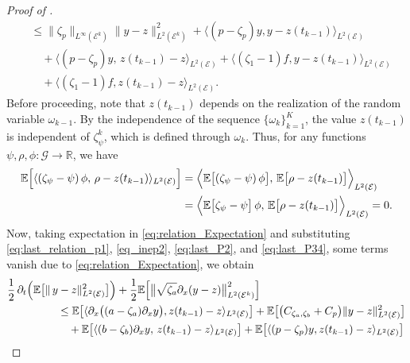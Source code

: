 \documentclass[a4paper, 10pt, english]{article}
\def\to{\rightarrow}
\begin{document}
\begin{proof}[Proof of  ]
\begin{align}
&\le
\|\zeta_p\|_{L^\infty(\mathcal{E}^k)}\|y - z\|_{L^2(\mathcal{E}^k)}^2
+
\bigl\langle
  (p - \zeta_p)y,
  y - z(t_{k-1})
\bigr\rangle_{L^2(\mathcal{E})}
\nonumber \\
&\quad
+
\bigl\langle
  (p - \zeta_p)y,
  \,z(t_{k-1}) - z
\bigr\rangle_{L^2(\mathcal{E})}
+
\bigl\langle
  (\zeta_1 - 1)f,
  y - z(t_{k-1})
\bigr\rangle_{L^2(\mathcal{E})}
\nonumber \\
&\quad
+
\bigl\langle
  (\zeta_1 - 1)f,
  z(t_{k-1}) - z
\bigr\rangle_{L^2(\mathcal{E})}.
\end{align}
Before proceeding, note that $z(t_{k-1})$ depends on the realization of the random variable $\omega_{k-1}$. By the independence of the sequence $\{\omega_k\}_{k=1}^K$, the value $z(t_{k-1})$ is independent of $\zeta_\psi^k$, which is defined through $\omega_k$. Thus, for any functions $\psi, \rho, \phi: \mathcal{G} \to \mathbb{R}$, we have
\begin{align}\label{eq:relation_Expectation}
\nonumber
\mathbb{E}\Bigl[\langle (\zeta_\psi - \psi)\,\phi,\,\rho - z(t_{k-1})\rangle_{L^2(\mathcal{E})}\Bigr]
&=
\Bigl\langle
  \mathbb{E}\bigl[(\zeta_\psi - \psi)\,\phi\bigr],
  \,\mathbb{E}\bigl[\rho - z(t_{k-1})\bigr]
\Bigr\rangle_{L^2(\mathcal{E})}
\\
&=
\Bigl\langle
  \mathbb{E}\bigl[\zeta_\psi - \psi\bigr]\,\phi,
  \,\mathbb{E}\bigl[\rho - z(t_{k-1})\bigr]
\Bigr\rangle_{L^2(\mathcal{E})}
= 0.
\end{align}
Now, taking expectation in \eqref{eq:relation_Expectation} and substituting \eqref{eq:last_relation_p1}, \eqref{eq_inep2}, \eqref{eq:last_P2}, and \eqref{eq:last_P34}, some terms vanish due to \eqref{eq:relation_Expectation}, we obtain
\begin{align}\label{eq:fist_after_expectation}
\nonumber\frac{1}{2}\,\partial_t \Bigl(\mathbb{E}\bigl[\|\,y - z\|_{L^2(\mathcal{E})}^2\bigr]\Bigr)&
+
\frac{1}{2}
\mathbb{E}\Bigl[\bigl\|\sqrt{\zeta_a}\partial_x(y - z)\bigr\|_{L^2(\mathcal{E}^k)}^2\Bigr]
\\
\nonumber&\hspace{-1.9cm}\le
\mathbb{E}\bigl[\langle \partial_x\bigl((a - \zeta_a)\partial_x y\bigr),z(t_{k-1}) - z\rangle_{L^2(\mathcal{E})}\bigr]
+
\mathbb{E}\bigl[\bigl(C_{\zeta_a,\zeta_b} + C_p\bigr)\|y - z\|_{L^2(\mathcal{E})}^2\bigr]
\\
\nonumber&\hspace{-1.9cm}\quad
+
\mathbb{E}\bigl[\langle (b - \zeta_b)\partial_x y,\,z(t_{k-1}) - z\rangle_{L^2(\mathcal{E})}\bigr]
+
\mathbb{E}\bigl[\langle (p - \zeta_p)y,z(t_{k-1}) - z\rangle_{L^2(\mathcal{E})}\bigr]

\end{align}
\end{proof}
\end{document}
